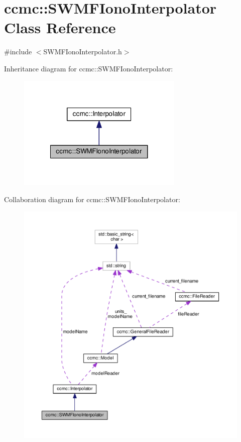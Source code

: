 \hypertarget{classccmc_1_1_s_w_m_f_iono_interpolator}{\section{ccmc\-:\-:S\-W\-M\-F\-Iono\-Interpolator Class Reference}
\label{classccmc_1_1_s_w_m_f_iono_interpolator}
}


{\ttfamily \#include $<$S\-W\-M\-F\-Iono\-Interpolator.\-h$>$}



Inheritance diagram for ccmc\-:\-:S\-W\-M\-F\-Iono\-Interpolator\-:
\nopagebreak
\begin{figure}[H]
\begin{center}
\leavevmode
\includegraphics[width=224pt]{classccmc_1_1_s_w_m_f_iono_interpolator__inherit__graph}
\end{center}
\end{figure}


Collaboration diagram for ccmc\-:\-:S\-W\-M\-F\-Iono\-Interpolator\-:
\nopagebreak
\begin{figure}[H]
\begin{center}
\leavevmode
\includegraphics[width=350pt]{classccmc_1_1_s_w_m_f_iono_interpolator__coll__graph}
\end{center}
\end{figure}
